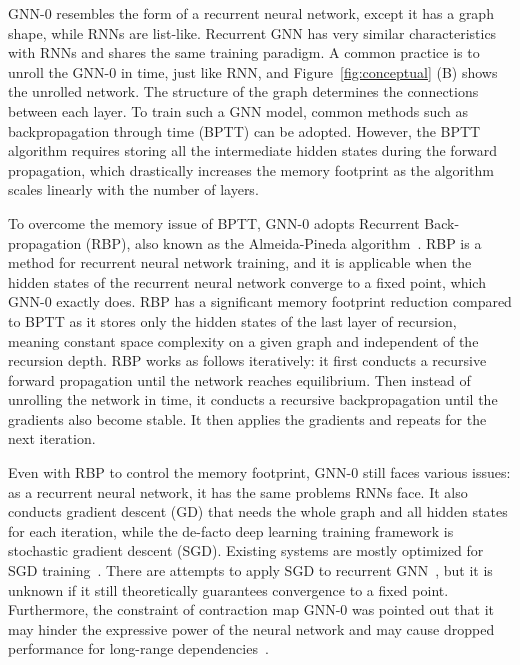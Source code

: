 GNN-0 resembles the form of a recurrent neural network, except it has a graph shape, while RNNs are list-like. Recurrent GNN has very similar characteristics with RNNs and shares the same training paradigm. A common practice is to unroll the GNN-0 in time, just like RNN, and Figure~\ref{fig:conceptual} (B) shows the unrolled network. The structure of the graph determines the connections between each layer. To train such a GNN model, common methods such as backpropagation through time (BPTT) can be adopted. However, the BPTT algorithm requires storing all the intermediate hidden states during the forward propagation, which drastically increases the memory footprint as the algorithm scales linearly with the number of layers. 

To overcome the memory issue of BPTT, GNN-0 adopts Recurrent Back-propagation (RBP), also known as the Almeida-Pineda algorithm~\cite{almeida, pineda}. RBP is a method for recurrent neural network training, and it is applicable when the hidden states of the recurrent neural network converge to a fixed point, which GNN-0 exactly does. RBP has a significant memory footprint reduction compared to BPTT as it stores only the hidden states of the last layer of recursion, meaning constant space complexity on a given graph and independent of the recursion depth. RBP works as follows iteratively: it first conducts a recursive forward propagation until the network reaches equilibrium. Then instead of unrolling the network in time, it conducts a recursive backpropagation until the gradients also become stable. It then applies the gradients and repeats for the next iteration.

Even with RBP to control the memory footprint, GNN-0 still faces various issues: as a recurrent neural network, it has the same problems RNNs face. It also conducts gradient descent (GD) that needs the whole graph and all hidden states for each iteration, while the de-facto deep learning training framework is stochastic gradient descent (SGD). Existing systems are mostly optimized for SGD training~\cite{cerebro, tf, torch, horovod}. There are attempts to apply SGD to recurrent GNN~\cite{sse}, but it is unknown if it still theoretically guarantees convergence to a fixed point. Furthermore, the constraint of contraction map GNN-0 was pointed out that it may hinder the expressive power of the neural network and may cause dropped performance for long-range dependencies~\cite{ggnn}.

